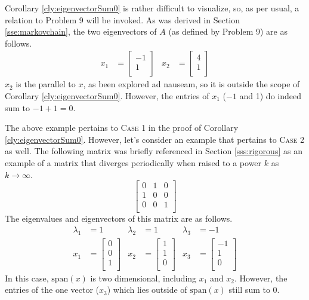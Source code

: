 \documentclass[titlepage]{article}
\newcommand{\spn}[1]{\text{span}\left( #1 \right)}
\begin{document}
Corollary \ref{cly:eigenvectorSum0} is rather difficult to visualize, so, as per usual, a relation to Problem 9 will be invoked. As was derived in Section \ref{sse:markovchain}, the two eigenvectors of $A$ (as defined by Problem 9) are as follows.
\begin{align*}
    x_1 &=
    \begin{bmatrix}
        -1\\
        1\\
    \end{bmatrix}&
        x_2 &=
        \begin{bmatrix}
            4\\
            1\\
        \end{bmatrix}
\end{align*}
$x_2$ is the parallel to $x$, as been explored ad nauseam, so it is outside the scope of Corollary \ref{cly:eigenvectorSum0}. However, the entries of $x_1$ ($-1$ and 1) do indeed sum to $-1+1=0$.\par
The above example pertains to \textsc{Case 1} in the proof of Corollary \ref{cly:eigenvectorSum0}. However, let's consider an example that pertains to \textsc{Case 2} as well. The following matrix was briefly referenced in Section \ref{sss:rigorous} as an example of a matrix that diverges periodically when raised to a power $k$ as $k\to\infty$.
\begin{equation*}
    \begin{bmatrix}
        0 & 1 & 0\\
        1 & 0 & 0\\
        0 & 0 & 1\\
    \end{bmatrix}
\end{equation*}
The eigenvalues and eigenvectors of this matrix are as follows.
\begin{align*}
    \lambda_1 &= 1&
        \lambda_2 &= 1&
            \lambda_3 &= -1\\
    x_1 &=
    \begin{bmatrix}
        0\\
        0\\
        1\\
    \end{bmatrix}&
        x_2 &=
        \begin{bmatrix}
            1\\
            1\\
            0\\
        \end{bmatrix}&
            x_3 &=
            \begin{bmatrix}
                -1\\
                1\\
                0\\
            \end{bmatrix}
\end{align*}
In this case, $\spn{x}$ is two dimensional, including $x_1$ and $x_2$. However, the entries of the one vector ($x_3$) which lies outside of $\spn{x}$ still sum to 0.
\newpage



\printglossaries
\newpage





\end{document}

